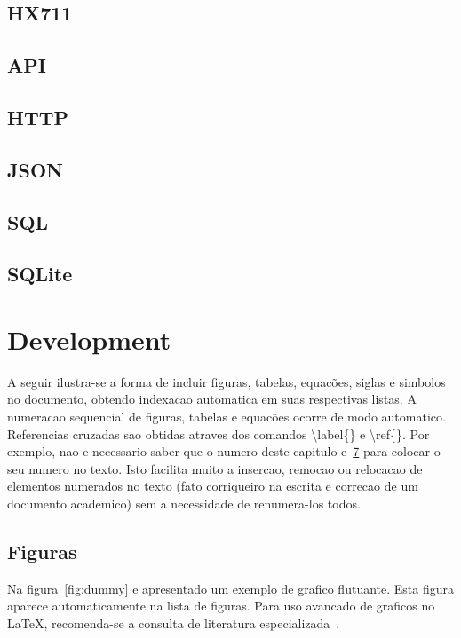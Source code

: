\documentclass[openright]{normas-utf-tex} %
\begin{document}
\section{HX711}

\section{API}

\section{HTTP}

\section{JSON}

\section{SQL}

\section{SQLite}

\chapter{Development}
\label{chap:desenv}

A seguir ilustra-se a forma de incluir figuras, tabelas, equac\~oes, siglas e simbolos no documento, obtendo indexacao automatica em suas respectivas listas. A numeracao sequencial de figuras, tabelas e equac\~oes ocorre de modo automatico. Referencias cruzadas sao obtidas atraves dos comandos {\ttfamily \textbackslash label\{\}} e {\ttfamily \textbackslash ref\{\}}. Por exemplo, nao e necessario saber que o numero deste capitulo e~\ref{chap:desenv} para colocar o seu numero no texto. Isto facilita muito a insercao, remocao ou relocacao de elementos numerados no texto (fato corriqueiro na escrita e correcao de um documento academico) sem a necessidade de renumera-los todos.

\section{Figuras}

Na figura~\ref{fig:dummy} e apresentado um exemplo de grafico flutuante. Esta figura aparece automaticamente na lista de figuras. Para uso avancado de graficos no \LaTeX, recomenda-se a consulta de literatura especializada~\cite{Goossens2007}.
\end{document}
